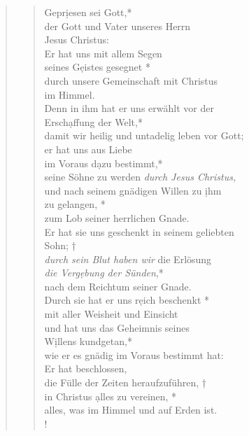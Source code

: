 \begin{quote}
\begin{verse}
Gepr\d iesen sei Gott,*\\
der Gott und Vater unseres Herrn\\
Jesus Christus:\\
\vin Er hat uns mit allem Segen \\ 
\vin seines G\d eistes gesegnet *\\
\vin durch unsere Gemeinschaft mit Christus\\ 
\vin im Himmel.\\
Denn in ihm hat er uns erwählt vor der\\
Ersch\d affung der Welt,*\\
damit wir heilig und untadelig leben vor Gott;\\
\vin er hat uns aus Liebe\\ 
\vin im Voraus d\d azu bestimmt,*\\
\vin seine Söhne zu werden \textit{durch Jesus Christus,}\\
und nach seinem gnädigen Willen zu \d ihm \\
zu gelangen, *\\
zum Lob seiner herrlichen Gnade.\\
\vin Er hat sie uns geschenkt in seinem geliebten\\ 
\vin Sohn; †\\
\vin \textit{durch sein Blut haben wir} die Erlösung \\ 
\vin \textit{die Verg\d ebung der Sünden},*\\
\vin nach dem Reichtum seiner Gnade. \\
Durch sie hat er uns r\d eich beschenkt *\\
mit aller Weisheit und Einsicht \\
\vin und hat uns das Geheimnis seines\\ 
\vin W\d illens kundgetan,* \\
\vin wie er es gnädig im Voraus bestimmt hat: \\
Er hat beschlossen, \\
die Fülle der Zeiten heraufzuführen, †\\
in Christus \d alles zu vereinen, *\\
alles, was im Himmel und auf Erden ist. \\!

\end{verse}
\end{quote}

